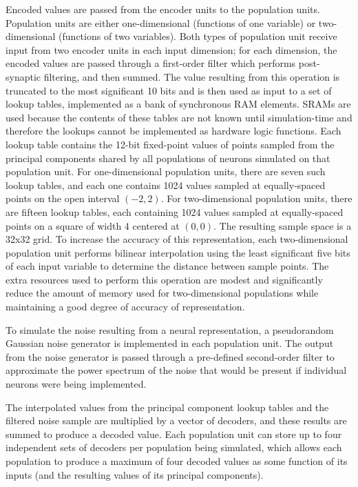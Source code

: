 \documentclass[english]{article}
\begin{document}
Encoded values are passed from the encoder units to the population units. Population units are either one-dimensional
(functions of one variable) or two-dimensional (functions of two variables).
Both types of population unit receive input from two encoder units in each input dimension;
for each dimension, the encoded values are passed through a first-order filter which performs post-synaptic filtering, %
and then summed. The value resulting from this operation is
truncated to the most significant 10 bits and is then used as input to a set of lookup tables,
implemented as a bank of synchronous RAM elements. SRAMs are used
because the contents of these tables are not known until simulation-time and therefore the lookups cannot be implemented as hardware logic functions.
Each lookup table contains the 12-bit fixed-point values of points sampled from the principal components shared by all populations of neurons
simulated on that population unit. For one-dimensional population units, there are seven such lookup tables, and each one contains
1024 values sampled at equally-spaced points on the open interval $(-2, 2)$. For two-dimensional population units,
there are fifteen lookup tables, each containing 1024 values sampled at equally-spaced points on a square of width 4
centered at $(0, 0)$. The resulting sample space is a 32x32 grid.
To increase the accuracy of this representation, each two-dimensional population unit performs bilinear interpolation
using the least significant five bits of each input variable to determine the distance between sample points. 
The extra resources used to perform this operation are modest
and significantly reduce the amount of memory used for two-dimensional populations while maintaining a good degree of accuracy of representation.

To simulate the noise resulting from a neural representation, a pseudorandom Gaussian noise generator is implemented in each population unit.
The output from the noise generator is passed through a pre-defined second-order filter to approximate the power spectrum of the noise
that would be present if individual neurons were being implemented. %

The interpolated values from the principal component lookup tables and the filtered noise sample are multiplied by a vector of decoders,
and these results are summed to produce a decoded value. Each population unit can store up to four independent sets of decoders per population being simulated,
which allows each population to produce a maximum of four decoded values as some function of its inputs
(and the resulting values of its principal components).
\end{document}
